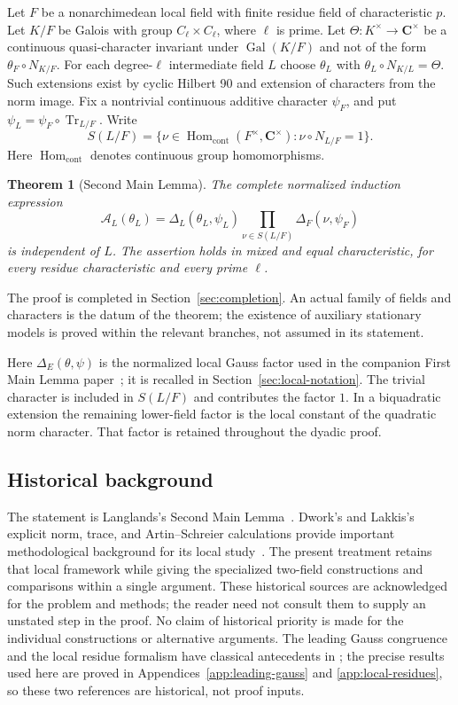 \documentclass[11pt]{amsart}
\newtheorem{theorem}{Theorem}[section]
\theoremstyle{definition}
\theoremstyle{remark}
\newcommand{\Tr}{\operatorname{Tr}}
\newcommand{\Gal}{\operatorname{Gal}}
\newcommand{\CC}{\mathbf C}\newcommand{\TT}{\mathcal T}\newcommand{\ind}{\mathbf1}
\begin{document}
Let $F$ be a nonarchimedean local field with finite residue field of
characteristic $p$. Let $K/F$ be Galois with group $C_\ell\times C_\ell$,
where $\ell$ is prime. Let $\Theta:K^\times\to\CC^\times$ be a continuous
quasi-character invariant under $\Gal(K/F)$ and not of the form
$\theta_F\circ N_{K/F}$. For each degree-$\ell$ intermediate field $L$
choose $\theta_L$ with $\theta_L\circ N_{K/L}=\Theta$. Such extensions
exist by cyclic Hilbert 90 and extension of characters from the norm image.
Fix a nontrivial continuous additive character $\psi_F$, and put
$\psi_L=\psi_F\circ\Tr_{L/F}$. Write
\[
 S(L/F)=\{\nu\in\operatorname{Hom}_{\mathrm{cont}}(F^\times,\CC^\times):
             \nu\circ N_{L/F}=1\}.
\]
Here $\operatorname{Hom}_{\mathrm{cont}}$ denotes continuous group homomorphisms.
\begin{theorem}[Second Main Lemma]\label{U:main}
The complete normalized induction expression
\[
 \mathcal A_L(\theta_L)=\Delta_L(\theta_L,\psi_L)
                \prod_{\nu\in S(L/F)}\Delta_F(\nu,\psi_F)
\]
is independent of $L$. The assertion holds in mixed and equal
characteristic, for every residue characteristic and every prime $\ell$.
\end{theorem}
The proof is completed in Section~\ref{sec:completion}. An actual family of fields and
characters is the datum of the theorem; the existence of auxiliary
stationary models is proved within the relevant branches, not assumed in
its statement.


Here $\Delta_E(\theta,\psi)$ is the normalized local Gauss factor used in
the companion First Main Lemma paper~\cite{Ueda}; it is recalled in
Section~\ref{sec:local-notation}. The trivial character is included in
$S(L/F)$ and contributes the factor $1$. In a biquadratic extension the
remaining lower-field factor is the local constant of the quadratic
norm character. That factor is retained throughout the dyadic proof.

\subsection*{Historical background}
The statement is Langlands's Second Main Lemma~\cite{Langlands}.
Dwork's and Lakkis's explicit norm, trace, and Artin--Schreier
calculations provide important methodological background for its local
study~\cite{Dwork,Lakkis}. The present treatment retains that local
framework while giving the specialized two-field constructions and
comparisons within a single argument. These historical sources are
acknowledged for the problem and methods; the reader need not consult
them to supply an unstated step in the proof. No claim of historical
priority is made for the individual constructions or alternative
arguments. The leading Gauss congruence and the local residue formalism
have classical antecedents in \cite{Stickelberger,TateResidue}; the
precise results used here are proved in Appendices~\ref{app:leading-gauss}
and \ref{app:local-residues}, so these two references are historical,
not proof inputs.
\end{document}
